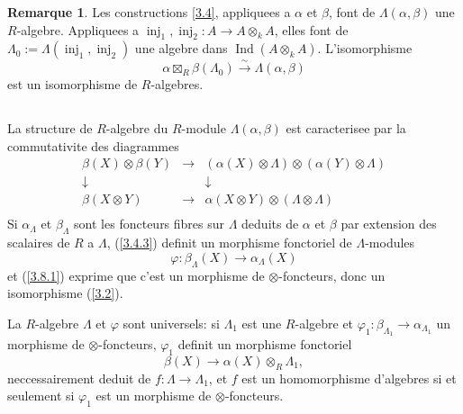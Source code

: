 \documentclass[11pt,a4paper]{article}
\theoremstyle{plain}
\theoremstyle{definition}
\newtheorem{remark}[theorem]{Remarque}
\DeclareMathOperator{\Ind}{Ind}
\newcommand{\inj}{\operatorname{inj}}
\begin{document}
\begin{remark}\label{3.7}
Les constructions \ref{3.4}, appliquees a $\alpha$ et $\beta$, font de $\Lambda(\alpha,\beta)$ une $R$-algebre. Appliquees a $\inj_1,\inj_2:A\to A\otimes_k A$, elles font de $\Lambda_0:=\Lambda(\inj_1,\inj_2)$ une algebre dans $\Ind(A\otimes_k A)$. L'isomorphisme
\[
\alpha\boxtimes_R\beta(\Lambda_0)\xrightarrow{\sim}\Lambda(\alpha,\beta)
\]
est un isomorphisme de $R$-algebres.
\end{remark}

\subsection{}\label{3.8}

La structure de $R$-algebre du $R$-module $\Lambda(\alpha,\beta)$ est caracterisee par la commutativite des diagrammes
\begin{equation}\label{3.8.1}
\begin{matrix}
\beta(X)\otimes\beta(Y) & \longrightarrow & (\alpha(X)\otimes\Lambda)\otimes(\alpha(Y)\otimes\Lambda)\\
\downarrow & & \downarrow\\
\beta(X\otimes Y) & \longrightarrow & \alpha(X\otimes Y)\otimes(\Lambda\otimes\Lambda)\\
\end{matrix}
\end{equation}
Si $\alpha_\Lambda$ et $\beta_\Lambda$ sont les foncteurs fibres sur $\Lambda$ deduits de $\alpha$ et $\beta$ par extension des scalaires de $R$ a $\Lambda$, (\ref{3.4.3}) definit un morphisme fonctoriel de $\Lambda$-modules
\begin{equation}\label{3.8.2}
\varphi:\beta_\Lambda(X)\to\alpha_\Lambda(X)
\end{equation}
et (\ref{3.8.1}) exprime que c'est un morphisme de $\otimes$-foncteurs, donc un isomorphisme (\ref{3.2}).

La $R$-algebre $\Lambda$ et $\varphi$ sont universels: si $\Lambda_1$ est une $R$-algebre et $\varphi_1:\beta_{\Lambda_1}\to\alpha_{\Lambda_1}$ un morphisme de $\otimes$-foncteurs, $\varphi_1$ definit un morphisme fonctoriel
\[
\beta(X)\to\alpha(X)\otimes_R\Lambda_1,
\]
neccessairement deduit de $f:\Lambda\to\Lambda_1$, et $f$ est un homomorphisme d'algebres si et seulement si $\varphi_1$ est un morphisme de $\otimes$-foncteurs.

\subsection{}\label{3.9}
\end{document}
